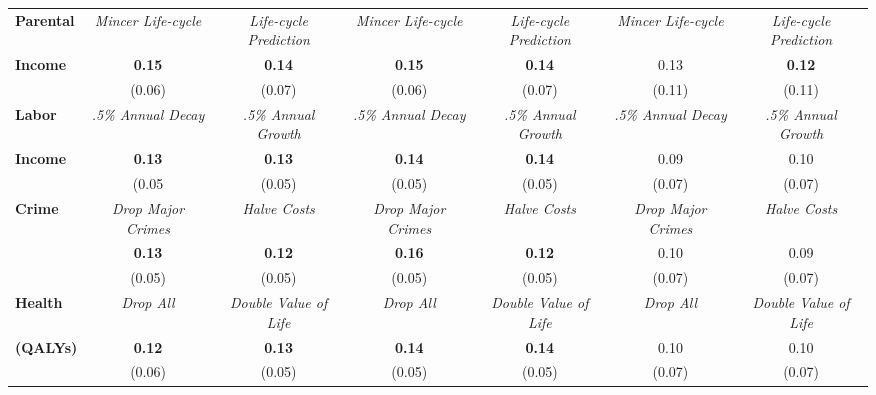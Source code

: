\begin{tabular}{>{\bfseries}lcc|cc|cc}
Parental	&	\textit{Mincer Life-cycle}	&	\textit{Life-cycle Prediction}	&	\textit{Mincer Life-cycle}	&	\textit{Life-cycle Prediction}	&	\textit{Mincer Life-cycle}	&	\textit{Life-cycle Prediction}	\\
Income	&	\textbf{0.15}	&	\textbf{0.14}	&	\textbf{0.15}	&	\textbf{0.14}	&	0.13	&	\textbf{0.12}	\\
	&	(0.06)	&	(0.07)	&	(0.06)	&	(0.07)	&	(0.11)	&	(0.11)	\\ \midrule
Labor	&	\textit{.5\% Annual Decay}	&	\textit{.5\% Annual Growth}	&	\textit{.5\% Annual Decay}	&	\textit{.5\% Annual Growth}	&	\textit{.5\% Annual Decay}	&	\textit{.5\% Annual Growth}	\\
Income	&	\textbf{0.13}	&	\textbf{0.13}	&	\textbf{0.14}	&	\textbf{0.14}	&	0.09	&	0.10	\\
	&	(0.05	&	(0.05)	&	(0.05)	&	(0.05)	&	(0.07)	&	(0.07)	\\ \midrule
Crime	&	\textit{Drop Major Crimes}	&	\textit{Halve Costs}	&	\textit{Drop Major Crimes}	&	\textit{Halve Costs}	&	\textit{Drop Major Crimes}	&	\textit{Halve Costs}	\\
	&	\textbf{0.13}	&	\textbf{0.12}	&	\textbf{0.16}	&	\textbf{0.12}	&	0.10	&	0.09	\\
	&	(0.05)	&	(0.05)	&	(0.05)	&	(0.05)	&	(0.07)	&	(0.07)	\\ \midrule
Health	&	\textit{Drop All}	&	\textit{Double Value of Life}	&	\textit{Drop All}	&	\textit{Double Value of Life}	&	\textit{Drop All}	&	\textit{Double Value of Life}	\\
(QALYs)	&	\textbf{0.12}	&	\textbf{0.13}	&	\textbf{0.14}	&	\textbf{0.14}	&	0.10	&	0.10	\\
	&	(0.06)	&	(0.05)	&	(0.05)	&	(0.05)	&	(0.07)	&	(0.07)	\\ \bottomrule
\end{tabular} 